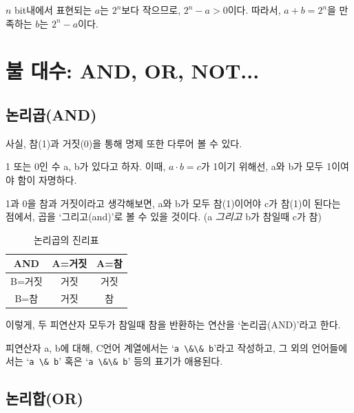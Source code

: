 \documentclass[a4paper,12pt]{book}
\newcommand{\V}[1]{\Verb|#1|}
\begin{document}
\begin{appendices}
            $n$ bit내에서 표현되는 $a$는 $2^n$보다 작으므로,
            $2^n - a > 0$이다.
            따라서, $a + b = 2^n$을 만족하는 $b$는 $2^n - a$이다.


\section{불 대수: AND, OR, NOT...}

    \subsection{논리곱(AND)}

        사실, 참(1)과 거짓(0)을 통해 명제 또한 다루어 볼 수 있다.

        1 또는 0인 수 a, b가 있다고 하자.
        이때, $a \cdot b = c$가 1이기 위해선,
        a와 b가 모두 1이여야 함이 자명하다.

        1과 0을 참과 거짓이라고 생각해보면,
        a와 b가 모두 참(1)이어야 c가 참(1)이 된다는 점에서,
        곱을 `그리고(and)'로 볼 수 있을 것이다.
        ({a \textit{그리고} b}가 참일때 c가 참)


        \begin{table}[H]
            \centering

            \caption{논리곱의 진리표}

            \begin{tabular}{ || c || c | c || }
                \hline
                AND   & A=거짓 & A=참 \\
                \hline\hline
                B=거짓 &   거짓 & 거짓 \\
                \hline
                B=참   &  거짓 &   참 \\
                \hline
            \end{tabular}
        \end{table}

        이렇게, 두 피연산자 모두가 참일때 참을 반환하는 연산을 `논리곱(AND)'라고 한다.

        피연산자 a, b에 대해, C언어 계열에서는 `\V{a \&\& b}'라고 작성하고,
        그 외의 언어들에서는 `\V{a \& b}' 혹은 `\V{a \&\& b}' 등의 표기가 애용된다.


    \subsection{논리합(OR)}


\end{appendices}
\end{document}
